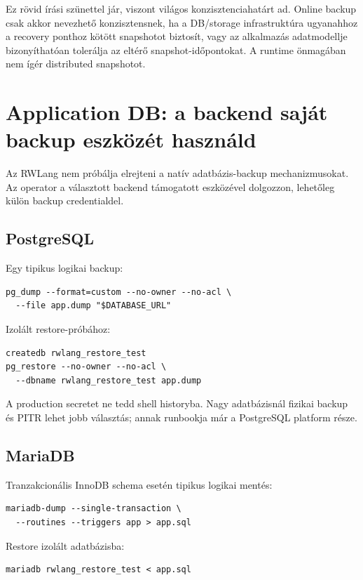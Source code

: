 Ez rövid írási szünettel jár, viszont világos konzisztenciahatárt ad. Online backup csak akkor nevezhető konzisztensnek, ha a DB/storage infrastruktúra ugyanahhoz a recovery ponthoz kötött snapshotot biztosít, vagy az alkalmazás adatmodellje bizonyíthatóan tolerálja az eltérő snapshot-időpontokat. A runtime önmagában nem ígér distributed snapshotot.

\section{Application DB: a backend saját backup eszközét használd}

Az RWLang nem próbálja elrejteni a natív adatbázis-backup mechanizmusokat. Az operator a választott backend támogatott eszközével dolgozzon, lehetőleg külön backup credentialdel.

\subsection*{PostgreSQL}

Egy tipikus logikai backup:

\begin{lstlisting}
pg_dump --format=custom --no-owner --no-acl \
  --file app.dump "$DATABASE_URL"
\end{lstlisting}

Izolált restore-próbához:

\begin{lstlisting}
createdb rwlang_restore_test
pg_restore --no-owner --no-acl \
  --dbname rwlang_restore_test app.dump
\end{lstlisting}

A production secretet ne tedd shell historyba. Nagy adatbázisnál fizikai backup és PITR lehet jobb választás; annak runbookja már a PostgreSQL platform része.

\subsection*{MariaDB}

Tranzakcionális InnoDB schema esetén tipikus logikai mentés:

\begin{lstlisting}
mariadb-dump --single-transaction \
  --routines --triggers app > app.sql
\end{lstlisting}

Restore izolált adatbázisba:

\begin{lstlisting}
mariadb rwlang_restore_test < app.sql
\end{lstlisting}

